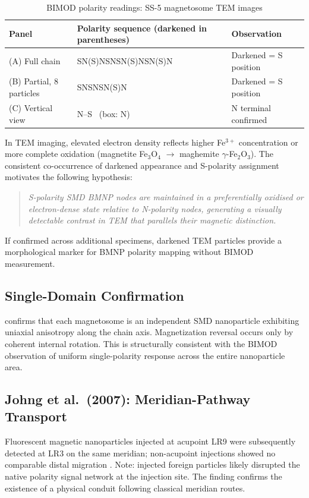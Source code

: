 \documentclass[12pt,a4paper]{article}
\begin{document}
\begin{table}[h]
\centering
\caption{BIMOD polarity readings: SS-5 magnetosome TEM images}
\label{tab:tem}
\begin{tabular}{p{2.2cm} p{5.8cm} p{4.5cm}}
\toprule
Panel & Polarity sequence (darkened in parentheses) & Observation \\
\midrule
(A) Full chain &
  SN(S)NSNSN(S)NSN(S)N &
  Darkened = S position \\[4pt]
(B) Partial, 8 particles &
  SNSNSN(S)N &
  Darkened = S position \\[4pt]
(C) Vertical view &
  N--S \ (box: N) &
  N terminal confirmed \\
\bottomrule
\end{tabular}
\end{table}

In TEM imaging, elevated electron density reflects higher Fe$^{3+}$
concentration or more complete oxidation (magnetite Fe$_3$O$_4$
$\to$ maghemite $\gamma$-Fe$_2$O$_3$).  The consistent co-occurrence
of darkened appearance and S-polarity assignment motivates the
following hypothesis:

\begin{quote}
\textit{S-polarity SMD BMNP nodes are maintained in a preferentially
oxidised or electron-dense state relative to N-polarity nodes,
generating a visually detectable contrast in TEM that parallels
their magnetic distinction.}
\end{quote}

If confirmed across additional specimens, darkened TEM particles
provide a morphological marker for BMNP polarity mapping without
BIMOD measurement.

\subsection{Single-Domain Confirmation}
\cite{kornig2020} confirms that each magnetosome is an independent
SMD nanoparticle exhibiting uniaxial anisotropy along the chain axis.
Magnetization reversal occurs only by coherent internal rotation.
This is structurally consistent with the BIMOD observation of
uniform single-polarity response across the entire nanoparticle area.

\subsection{Johng et al.\ (2007): Meridian-Pathway Transport}
Fluorescent magnetic nanoparticles injected at acupoint LR9 were
subsequently detected at LR3 on the same meridian; non-acupoint
injections showed no comparable distal migration \cite{johng2007}.
Note: injected foreign particles likely disrupted the native polarity
signal network at the injection site.  The finding confirms the
existence of a physical conduit following classical meridian routes.
\end{document}

